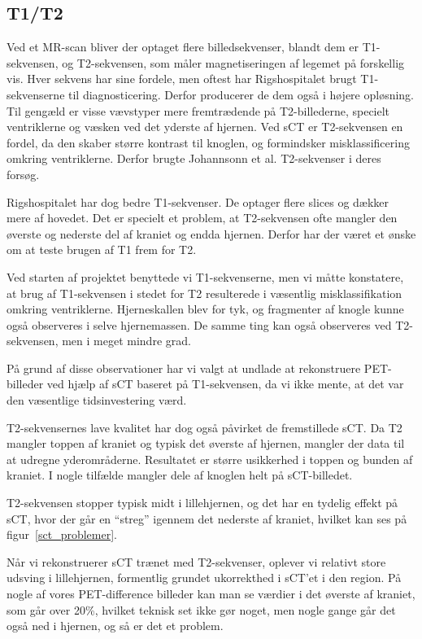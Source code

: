 \subsection{T1/T2}

Ved et MR-scan bliver der optaget flere billedsekvenser, blandt dem er T1-sekvensen, og T2-sekvensen, som måler magnetiseringen af legemet på forskellig vis. Hver sekvens har sine fordele, men oftest har Rigshospitalet brugt T1-sekvenserne til diagnosticering. Derfor producerer de dem også i højere opløsning. Til gengæld er visse vævstyper mere fremtrædende på T2-billederne, specielt ventriklerne og væsken ved det yderste af hjernen. Ved sCT er T2-sekvensen en fordel, da den skaber større kontrast til knoglen, og formindsker misklassificering omkring ventriklerne. Derfor brugte Johannsonn et al. T2-sekvenser i deres forsøg.

Rigshospitalet har dog bedre T1-sekvenser. De optager flere slices og dækker mere af hovedet. Det er specielt et problem, at T2-sekvensen ofte mangler den øverste og nederste del af kraniet og endda hjernen. Derfor har der været et ønske om at teste brugen af T1 frem for T2.

Ved starten af projektet benyttede vi T1-sekvenserne, men vi måtte konstatere, at brug af T1-sekvensen i stedet for T2 resulterede i væsentlig misklassifikation omkring ventriklerne. Hjerneskallen blev for tyk, og fragmenter af knogle kunne også observeres i selve hjernemassen. De samme ting kan også observeres ved T2-sekvensen, men i meget mindre grad.

På grund af disse observationer har vi valgt at undlade at rekonstruere PET-billeder ved hjælp af sCT baseret på T1-sekvensen, da vi ikke mente, at det var den væsentlige tidsinvestering værd.

T2-sekvensernes lave kvalitet har dog også påvirket de fremstillede sCT. Da T2 mangler toppen af kraniet og typisk det øverste af hjernen, mangler der data til at udregne yderområderne. Resultatet er større usikkerhed i toppen og bunden af kraniet. I nogle tilfælde mangler dele af knoglen helt på sCT-billedet. 

T2-sekvensen stopper typisk midt i lillehjernen, og det har en tydelig effekt på sCT, hvor der går en “streg” igennem det nederste af kraniet, hvilket kan ses på figur~\ref{sct_problemer}. 

Når vi rekonstruerer sCT trænet med T2-sekvenser, oplever vi relativt store udsving i lillehjernen, formentlig grundet ukorrekthed i sCT’et i den region. På nogle af vores PET-difference billeder kan man se værdier i det øverste af kraniet, som går over 20\%, hvilket teknisk set ikke gør noget, men nogle gange går det også ned i hjernen, og så er det et problem.

